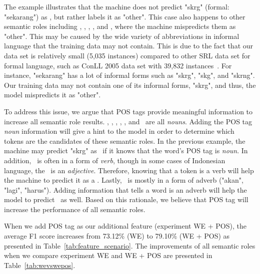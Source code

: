 The example illustrates that the machine does not predict "skrg" (formal: "sekarang") as \timesrl, but rather labels it as "other". This case also happens to other semantic roles including \agent, \patient, \beneficiary, \location, and \greet, where the machine mispredicts them as "other". This may be caused by the wide variety of abbreviations in informal language that the training data may not contain. This is due to the fact that our data set is relatively small (5,035 instances) compared to other SRL data set for formal language, such as ConLL 2005 data set with 39,832 instances~\citep{carreras2005introduction}. For instance, "sekarang" has a lot of informal forms such as "skrg", "skg", and "skrng". Our training data may not contain one of its informal forms, "skrg", and thus, the model mispredicts it as "other". 

To address this issue, we argue that POS tags provide meaningful information to increase all semantic role results. \agent, \patient, \beneficiary, \location, \greet, and \timesrl~are all \textit{nouns}. Adding the POS tag \textit{noun} information will give a hint to the model in order to determine which tokens are the candidates of these semantic roles. In the previous example, the machine may predict "skrg" as \timesrl~if it knows that the word's POS tag is \textit{noun}. In addition, \predicate~is often in a form of \textit{verb}, though in some cases of Indonesian language, the \predicate~is an \textit{adjective}. Therefore, knowing that a token is a verb will help the machine to predict it as a \predicate. Lastly, \modal~is mostly in a form of adverb ("akan", "lagi", "harus"). Adding information that tells a word is an adverb will help the model to predict \modal~as well. Based on this rationale, we believe that POS tag will increase the performance of all semantic roles.

When we add POS tag as our additional feature (experiment WE + POS), the average F1 score increases from 73.12\% (WE) to 79.10\% (WE + POS) as presented in Table~\ref{tab:feature_scenario}. The improvements of all semantic roles when we compare experiment WE and WE + POS are presented in Table~\ref{tab:wevswepos}.

